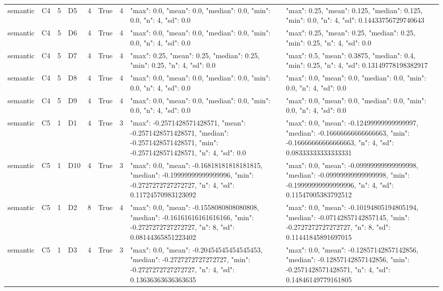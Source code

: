 \begin{tabular}{lllllllll}
semantic & C4 & 5 & D5 & 4 & True & 4 & {"max": 0.0, "mean": 0.0, "median": 0.0, "min": 0.0, "n": 4, "sd": 0.0} & {"max": 0.25, "mean": 0.125, "median": 0.125, "min": 0.0, "n": 4, "sd": 0.14433756729740643} \\
semantic & C4 & 5 & D6 & 4 & True & 4 & {"max": 0.0, "mean": 0.0, "median": 0.0, "min": 0.0, "n": 4, "sd": 0.0} & {"max": 0.25, "mean": 0.25, "median": 0.25, "min": 0.25, "n": 4, "sd": 0.0} \\
semantic & C4 & 5 & D7 & 4 & True & 4 & {"max": 0.25, "mean": 0.25, "median": 0.25, "min": 0.25, "n": 4, "sd": 0.0} & {"max": 0.5, "mean": 0.3875, "median": 0.4, "min": 0.25, "n": 4, "sd": 0.13149778198382917} \\
semantic & C4 & 5 & D8 & 4 & True & 4 & {"max": 0.0, "mean": 0.0, "median": 0.0, "min": 0.0, "n": 4, "sd": 0.0} & {"max": 0.0, "mean": 0.0, "median": 0.0, "min": 0.0, "n": 4, "sd": 0.0} \\
semantic & C4 & 5 & D9 & 4 & True & 4 & {"max": 0.0, "mean": 0.0, "median": 0.0, "min": 0.0, "n": 4, "sd": 0.0} & {"max": 0.0, "mean": 0.0, "median": 0.0, "min": 0.0, "n": 4, "sd": 0.0} \\
semantic & C5 & 1 & D1 & 4 & True & 3 & {"max": -0.2571428571428571, "mean": -0.2571428571428571, "median": -0.2571428571428571, "min": -0.2571428571428571, "n": 4, "sd": 0.0} & {"max": 0.0, "mean": -0.12499999999999997, "median": -0.16666666666666663, "min": -0.16666666666666663, "n": 4, "sd": 0.08333333333333331} \\
semantic & C5 & 1 & D10 & 4 & True & 3 & {"max": 0.0, "mean": -0.16818181818181815, "median": -0.19999999999999996, "min": -0.2727272727272727, "n": 4, "sd": 0.11724570983123092} & {"max": 0.0, "mean": -0.09999999999999998, "median": -0.09999999999999998, "min": -0.19999999999999996, "n": 4, "sd": 0.11547005383792512} \\
semantic & C5 & 1 & D2 & 8 & True & 4 & {"max": 0.0, "mean": -0.1558080808080808, "median": -0.16161616161616166, "min": -0.2727272727272727, "n": 8, "sd": 0.08144365851223402} & {"max": 0.0, "mean": -0.10194805194805194, "median": -0.07142857142857145, "min": -0.2727272727272727, "n": 8, "sd": 0.11441845891697015} \\
semantic & C5 & 1 & D3 & 4 & True & 3 & {"max": 0.0, "mean": -0.20454545454545453, "median": -0.2727272727272727, "min": -0.2727272727272727, "n": 4, "sd": 0.13636363636363635} & {"max": 0.0, "mean": -0.12857142857142856, "median": -0.12857142857142856, "min": -0.2571428571428571, "n": 4, "sd": 0.14846149779161805} \\

\end{tabular}
